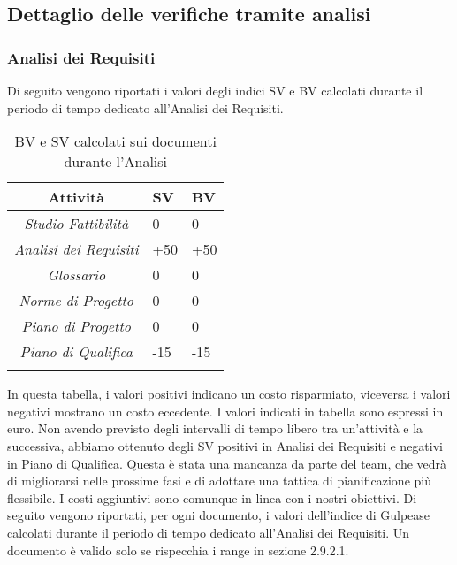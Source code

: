 \subsection{Dettaglio delle verifiche tramite analisi}
\subsubsection{Analisi dei Requisiti}
Di seguito vengono riportati i valori degli indici SV e BV calcolati durante il periodo di tempo dedicato all'Analisi dei Requisiti.
\begin{longtable}{|c|p{3cm}|p{3cm}|}
\toprule
\textbf{Attività} & \textbf{SV} & \textbf{BV} \\


\midrule
\emph{Studio Fattibilità} & 0 & 0 \\
\midrule
\emph{Analisi dei Requisiti} & +50 & +50\\
\midrule
\emph{Glossario} & 0  & 0\\
\midrule
\emph{Norme di Progetto} & 0 & 0\\
\midrule
\emph{Piano di Progetto} & 0 & 0\\
\midrule
\emph{Piano di Qualifica} & -15 & -15\\
\bottomrule
\caption{BV e SV calcolati sui documenti durante l'Analisi}
\label{tab:changelog}
\end{longtable}
In questa tabella, i valori positivi indicano un costo risparmiato, viceversa i valori negativi mostrano un costo eccedente.
I valori indicati in tabella sono espressi in euro.
Non avendo previsto degli intervalli di tempo libero tra un'attività e la successiva, abbiamo ottenuto degli SV positivi in Analisi dei Requisiti e negativi in Piano di Qualifica.
Questa è stata una mancanza da parte del team, che vedrà di migliorarsi nelle prossime fasi e di adottare una tattica di pianificazione più flessibile.
I costi aggiuntivi sono comunque in linea con i nostri obiettivi.
Di seguito vengono riportati, per ogni documento, i valori dell'indice di Gulpease calcolati durante il periodo di tempo dedicato all'Analisi dei Requisiti. Un documento è valido solo se rispecchia i range in sezione 2.9.2.1.
